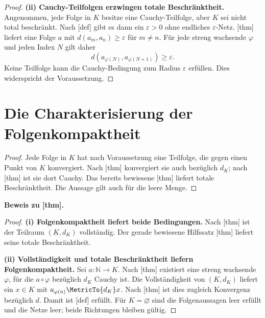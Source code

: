 \begin{proof}
\medskip\noindent\textbf{(ii) Cauchy-Teilfolgen erzwingen totale Beschränktheit.}
Angenommen, jede Folge in \(K\) besitze eine Cauchy-Teilfolge, aber \(K\)
sei nicht total beschränkt. Nach
[def] gibt es dann ein
\(\varepsilon>0\) ohne endliches \(\varepsilon\)-Netz.
[thm] liefert
eine Folge \(a\) mit \(d(a_m,a_n)\geq\varepsilon\) für \(m\ne n\).
Für jede streng wachsende \(\varphi\) und jeden Index \(N\) gilt daher
\[
 d(a_{\varphi(N)},a_{\varphi(N+1)})\geq\varepsilon.
\]
Keine Teilfolge kann die Cauchy-Bedingung zum Radius \(\varepsilon\)
erfüllen. Dies widerspricht der Voraussetzung.
\end{proof}

\section{Die Charakterisierung der Folgenkompaktheit}

\begin{proof}
Jede Folge in \(K\) hat nach Voraussetzung eine Teilfolge, die gegen einen
Punkt von \(K\) konvergiert. Nach
[thm] konvergiert sie auch
bezüglich \(d_K\); nach
[thm] ist sie dort Cauchy.
Das bereits bewiesene
[thm]
liefert totale Beschränktheit. Die Aussage gilt auch für die leere Menge.
\end{proof}

\noindent\textbf{Beweis zu
[thm].}
\begin{proof}
\noindent\textbf{(i) Folgenkompaktheit liefert beide Bedingungen.}
Nach [thm] ist der
Teilraum \((K,d_K)\) vollständig. Der gerade bewiesene Hilfssatz
[thm]
liefert seine totale Beschränktheit.

\medskip\noindent\textbf{(ii) Vollständigkeit und totale Beschränktheit
liefern Folgenkompaktheit.}
Sei \(a\colon\mathbb N\to K\). Nach
[thm]
existiert eine streng wachsende \(\varphi\), für die \(a\circ\varphi\)
bezüglich \(d_K\) Cauchy ist. Die Vollständigkeit von \((K,d_K)\)
liefert ein \(x\in K\) mit \(a_{\varphi(n)}\MetricTo{d_K}x\).
Nach [thm] ist dies
zugleich Konvergenz bezüglich \(d\). Damit ist
[def] erfüllt.
Für \(K=\varnothing\) sind die Folgenaussagen leer erfüllt und die
Netze leer; beide Richtungen bleiben gültig.
\end{proof}

